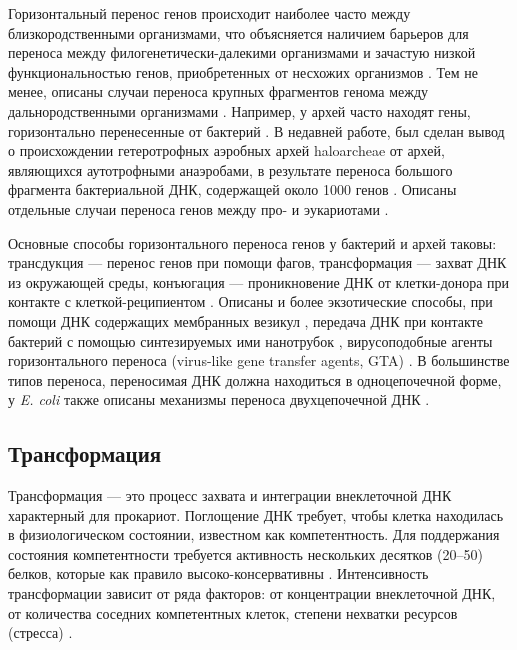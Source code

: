 Горизонтальный перенос генов происходит наиболее часто между близкородственными организмами, что объясняется наличием барьеров для переноса между филогенетически-далекими организмами и зачастую низкой функциональностью генов, приобретенных от несхожих организмов \cite{gonzalez2012barriers}. Тем не менее, описаны случаи переноса крупных фрагментов генома между дальнородственными организмами \cite{caro2015inter}. Например, у архей часто находят гены, горизонтально перенесенные от бактерий \cite{wagner2017mechanisms}. В недавней работе, был сделан вывод о происхождении гетеротрофных аэробных архей haloarcheae от архей, являющихся аутотрофными анаэробами, в результате переноса большого фрагмента бактериальной ДНК, содержащей около 1000 генов \cite{wagner2017mechanisms}. Описаны отдельные случаи переноса генов между про- и эукариотами \cite{lacroix2016transfer}. 

Основные способы горизонтального переноса генов у бактерий и архей таковы: трансдукция --- перенос генов при помощи фагов, трансформация --- захват ДНК из окружающей среды, конъюгация --- проникновение ДНК от клетки-донора при контакте с клеткой-реципиентом \cite{thomas2005mechanisms, wagner2017mechanisms}. Описаны и более экзотические способы, при помощи ДНК содержащих мембранных везикул \cite{biller2014bacterial}, передача ДНК при контакте бактерий с помощью синтезируемых ими нанотрубок \cite{dubey2011intercellular}, вирусоподобные агенты горизонтального переноса (virus-like gene transfer agents, GTA) \cite{brimacombe2015homologues}. В большинстве типов переноса, переносимая ДНК должна находиться в одноцепочечной форме, у \textit{E. coli} также описаны механизмы переноса двухцепочечной ДНК \cite{sun2018pull}.

\subsection{Трансформация}
Трансформация --- это процесс захвата и интеграции внеклеточной ДНК характерный для прокариот. Поглощение ДНК требует, чтобы клетка находилась в физиологическом состоянии, известном как компетентность. Для поддержания состояния компетентности требуется активность нескольких десятков (20–50) белков, которые как правило высоко-консервативны \cite{thomas2005mechanisms, sun2018pull}. Интенсивность трансформации зависит от ряда факторов: от концентрации внеклеточной ДНК, от количества соседних компетентных клеток, степени нехватки ресурсов (стресса) \cite{johnston2014bacterial}. 

